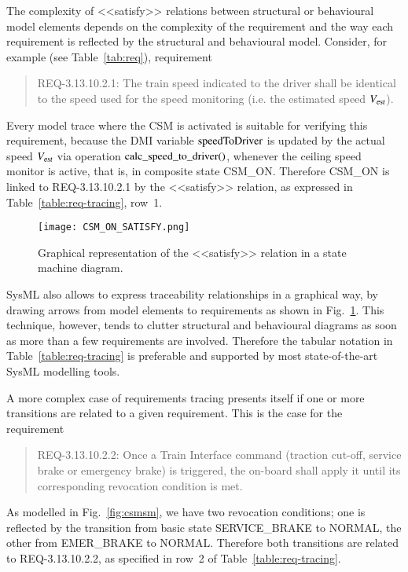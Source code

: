 The complexity of {\sf <<satisfy>>} relations between structural or behavioural model elements depends on the complexity of the requirement and the way each requirement is reflected by the structural and behavioural model. Consider, for example (see Table~\ref{tab:req}), requirement  
\begin{quote}
REQ-3.13.10.2.1: The train speed indicated to the driver shall be identical to the speed used for the speed monitoring (i.e. the estimated speed ${V_{\text{\sl est}}}$).
\end{quote}
Every model trace where the CSM is activated is suitable for verifying this requirement, because the DMI variable $\text{speedToDriver}$ is updated by the actual speed ${V_{\text{\sl est}}}$ via operation $\text{calc\_speed\_to\_driver()}$, whenever the ceiling speed monitor is active, that is, in composite state {\sf CSM\_ON}. Therefore 
{\sf CSM\_ON} is linked to REQ-3.13.10.2.1 by the {\sf <<satisfy>>} relation, as expressed
in Table~\ref{table:req-tracing}, row~1. 

 \begin{figure}
 \centering
\hspace*{-10mm}
\texttt{[image: CSM\_ON\_SATISFY.png]}
\vspace*{-45mm}
\caption{Graphical representation of the {\sf <<satisfy>>} relation in a state machine diagram.}
 \label{fig:satisfy}
 \end{figure}


SysML also allows   to express traceability relationships in a graphical 
way, by drawing arrows from model elements to requirements as shown in Fig.~\ref{fig:satisfy}.
This technique, however, tends to clutter structural and behavioural diagrams as soon as more than a few requirements are involved. Therefore the tabular notation in Table~\ref{table:req-tracing} is preferable and supported by most state-of-the-art SysML modelling tools. 


A more complex case of requirements tracing presents itself if one or more transitions are related to a given requirement. This is the case for the requirement
\begin{quote}
REQ-3.13.10.2.2: Once a Train Interface command (traction cut-off, service brake or emergency brake) is triggered, the on-board shall apply it until its corresponding revocation condition is met.
\end{quote}
As modelled in Fig.~\ref{fig:csmsm}, we have two revocation conditions; one is reflected by the transition from basic state {\sf SERVICE\_BRAKE} to {\sf NORMAL}, the other from {\sf EMER\_BRAKE} to {\sf NORMAL}. Therefore both transitions are related to REQ-3.13.10.2.2, as specified in row~2 of Table~\ref{table:req-tracing}.




